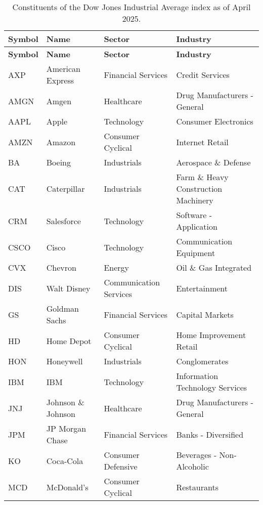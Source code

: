 \begin{longtable}{|p{2cm}|p{3cm}|p{4cm}|p{4cm}|}
\caption{Constituents of the Dow Jones Industrial Average index as of April 2025. \cite{DowJones30}}
\label{tab:dow30constituents}
\\ 
\hline
\textbf{Symbol} & \textbf{Name} & \textbf{Sector} & \textbf{Industry} \\ \midrule
\endfirsthead

\hline
\textbf{Symbol} & \textbf{Name} & \textbf{Sector} & \textbf{Industry} \\ \midrule
\endhead

\endfoot

\hline
AXP & American Express & Financial Services & Credit Services \\ \hline
AMGN & Amgen & Healthcare & Drug Manufacturers - General \\ \hline
AAPL & Apple & Technology & Consumer Electronics \\ \hline
AMZN & Amazon & Consumer Cyclical & Internet Retail \\ \hline
BA & Boeing & Industrials & Aerospace \& Defense \\ \hline
CAT & Caterpillar & Industrials & Farm \& Heavy Construction Machinery \\ \hline
CRM & Salesforce & Technology & Software - Application \\ \hline
CSCO & Cisco & Technology & Communication Equipment \\ \hline
CVX & Chevron & Energy & Oil \& Gas Integrated \\ \hline
DIS & Walt Disney & Communication Services & Entertainment \\ \hline
GS & Goldman Sachs & Financial Services & Capital Markets \\ \hline
HD & Home Depot & Consumer Cyclical & Home Improvement Retail \\ \hline
HON & Honeywell & Industrials & Conglomerates \\ \hline
IBM & IBM & Technology & Information Technology Services \\ \hline
JNJ & Johnson \& Johnson & Healthcare & Drug Manufacturers - General \\ \hline
JPM & JP Morgan Chase & Financial Services & Banks - Diversified \\ \hline
KO & Coca-Cola & Consumer Defensive & Beverages - Non-Alcoholic \\ \hline
MCD & McDonald's & Consumer Cyclical & Restaurants \\ \hline

\end{longtable}
